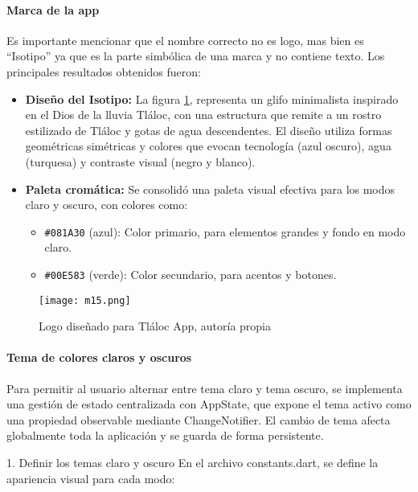 \paragraph{Marca de la app}
Es importante mencionar que el nombre correcto no es logo, mas bien es ``Isotipo'' ya que es la parte simbólica de una marca y no contiene texto. Los principales resultados obtenidos fueron:

\begin{itemize}
  \item \textbf{Diseño del Isotipo:} La figura \ref{m15}, representa un glifo minimalista inspirado en el Dios de la lluvia Tláloc, con una estructura que remite a un rostro estilizado de Tláloc y gotas de agua descendentes. El diseño utiliza formas geométricas simétricas y colores que evocan tecnología (azul oscuro), agua (turquesa) y contraste visual (negro y blanco).
  
  \item \textbf{Paleta cromática:} Se consolidó una paleta visual efectiva para los modos claro y oscuro, con colores como:
  \begin{itemize}
    \item \texttt{\#081A30} (azul): Color primario, para elementos grandes y fondo en modo claro.
    \item \texttt{\#00E583} (verde): Color secundario, para acentos y botones.
  \end{itemize} 
\end{itemize} 
\begin{figure}[h!]
\centering
  \texttt{[image: m15.png]}
  \caption{Logo diseñado para Tláloc App, autoría propia}
  \label{m15}
\end{figure}






\paragraph{Tema de colores claros y oscuros}


Para permitir al usuario alternar entre tema claro y tema oscuro, se implementa una gestión de estado centralizada con AppState, que expone el tema activo como una propiedad observable mediante ChangeNotifier. El cambio de tema afecta globalmente toda la aplicación y se guarda de forma persistente.

1. Definir los temas claro y oscuro
En el archivo constants.dart, se define la apariencia visual para cada modo:


